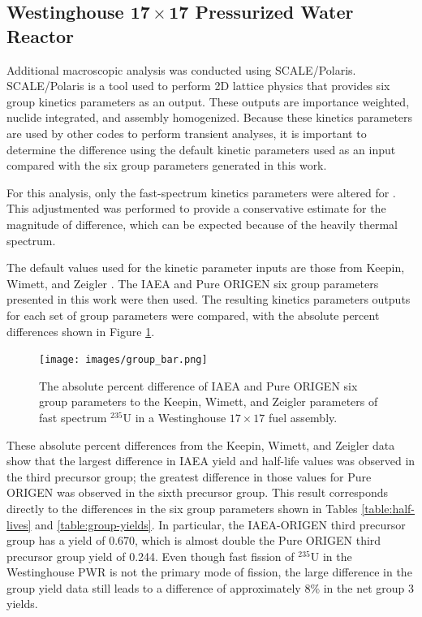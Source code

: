 \documentclass{style/nseJournal}
\begin{document}
\subsection{Westinghouse $\mathbf{17\times17}$ Pressurized Water Reactor}
\label{sec:W1717}

Additional macroscopic analysis was conducted using SCALE/Polaris. SCALE/Polaris is a tool used to perform 2D lattice physics that provides six group kinetics parameters as an output. These outputs are importance weighted, nuclide integrated, and assembly homogenized.
Because these kinetics parameters are used by other codes to perform transient analyses, it is important to determine the difference using the default kinetic parameters used as an input compared with the six group parameters generated in this work.

For this analysis, only the fast-spectrum kinetics parameters were altered for .
This adjustmented was performed to provide a conservative estimate for the magnitude of difference, which can be expected because of the heavily thermal spectrum.

The default values used for the kinetic parameter inputs are those from Keepin, Wimett, and Zeigler \cite{KEEPIN1957IN2}.
The IAEA and Pure ORIGEN six group parameters presented in this work were then used.
The resulting kinetics parameters outputs for each set of group parameters were compared, with the absolute percent differences shown in Figure \ref{fig:Polaris}.

\begin{figure}[]
\centering
\texttt{[image: images/group\_bar.png]}
\caption{The absolute percent difference of IAEA and Pure ORIGEN six group parameters to the Keepin, Wimett, and Zeigler parameters of fast spectrum $^{235}$U in a Westinghouse $17\times17$ fuel assembly.}
\label{fig:Polaris}
\end{figure}

These absolute percent differences from the Keepin, Wimett, and Zeigler data show that the largest difference in IAEA yield and half-life values was observed in the third precursor group; the greatest difference in those values for Pure ORIGEN was observed in the sixth precursor group.
This result corresponds directly to the differences in the six group parameters shown in Tables \ref{table:half-lives} and \ref{table:group-yields}.
In particular, the IAEA-ORIGEN third precursor group has a yield of 0.670, which is almost double the Pure ORIGEN third precursor group yield of 0.244.
Even though fast fission of $^{235}$U in the Westinghouse PWR is not the primary mode of fission, the large difference in the group yield data still leads to a difference of approximately 8\% in the net group 3 yields.
\end{document}
